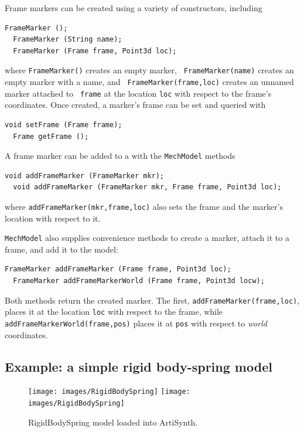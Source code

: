 Frame markers can be created using a variety of constructors, including
\begin{lstlisting}[]
  FrameMarker ();
  FrameMarker (String name);
  FrameMarker (Frame frame, Point3d loc);
\end{lstlisting}
%
where {\tt FrameMarker()} creates an empty marker, {\tt
FrameMarker(name)} creates an empty marker with a name, and {\tt
FrameMarker(frame,loc)} creates an unnamed marker attached to {\tt
frame} at the location {\tt loc} with respect to the frame's
coordinates. Once created, a marker's frame can be set and queried
with
\begin{lstlisting}[]
  void setFrame (Frame frame);
  Frame getFrame (); 
\end{lstlisting}
%
A frame marker can be added to a  with the
{\tt MechModel} methods
\begin{lstlisting}[]
  void addFrameMarker (FrameMarker mkr);
  void addFrameMarker (FrameMarker mkr, Frame frame, Point3d loc);
\end{lstlisting}
%
where {\tt addFrameMarker(mkr,frame,loc)} also sets the frame and the
marker's location with respect to it. 

{\tt MechModel} also supplies convenience methods to create a
marker, attach it to a frame, and add it to the model:
\begin{lstlisting}[]
  FrameMarker addFrameMarker (Frame frame, Point3d loc);
  FrameMarker addFrameMarkerWorld (Frame frame, Point3d locw);
\end{lstlisting}
%
Both methods return the created marker. 
The first, {\tt addFrameMarker(frame,loc)}, places it at the
location {\tt loc} with respect to the frame, while {\tt
addFrameMarkerWorld(frame,pos)} places it at {\tt pos} with respect to
{\it world} coordinates.

\subsection{Example: a simple rigid body-spring model}
\label{RigidBodySpringExample:sec}

\begin{figure}[ht]
\begin{center}
\iflatexml
 \texttt{[image: images/RigidBodySpring]}
\else
 \texttt{[image: images/RigidBodySpring]}
\fi
\end{center}
\caption{RigidBodySpring model loaded into ArtiSynth.}
\label{RigidBodySpring:fig}
\end{figure}

